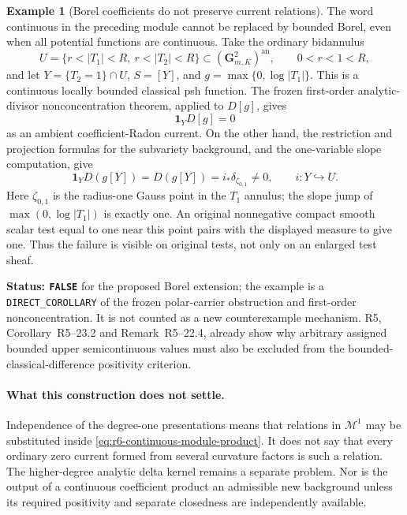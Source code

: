 \documentclass[11pt,a4paper]{article}
\numberwithin{equation}{section}
\theoremstyle{definition}
\newtheorem{example}[theorem]{Example}
\theoremstyle{remark}
\newcommand{\an}{\mathrm{an}}
\begin{document}
\begin{example}[Borel coefficients do not preserve current relations]
\label{ex:r6-borel-curvature-module-failure}
The word continuous in the preceding module cannot be replaced by
bounded Borel, even when all potential functions are continuous.
Take the ordinary bidannulus
\[
 U=\{r<|T_1|<R,\ r<|T_2|<R\}\subset(\mathbf G_{m,K}^2)^{\an},
             \qquad 0<r<1<R,
\]
and let $Y=\{T_2=1\}\cap U$, $S=[Y]$, and
$g=\max\{0,\log|T_1|\}$. This is a continuous locally bounded
classical psh function. The frozen first-order analytic-divisor
nonconcentration theorem, applied to $D[g]$, gives
\[
                         \mathbf1_YD[g]=0
\]
as an ambient coefficient-Radon current. On the other hand, the
restriction and projection formulas for the subvariety background,
and the one-variable slope computation, give
\[
 \mathbf1_YD(g[Y])=D(g[Y])=i_*\delta_{\zeta_{0,1}}\ne0,
                  \qquad i:Y\hookrightarrow U.
\]
Here $\zeta_{0,1}$ is the radius-one Gauss point in the $T_1$ annulus;
the slope jump of $\max(0,\log|T_1|)$ is exactly one. An original
nonnegative compact smooth scalar test equal to one near this point
pairs with the displayed measure to give one. Thus the failure is
visible on original tests, not only on an enlarged test sheaf.
\end{example}

\noindent\textbf{Status: \texttt{FALSE}} for the proposed Borel
extension; the example is a \texttt{DIRECT\_COROLLARY} of the frozen
polar-carrier obstruction and first-order nonconcentration. It is not
counted as a new counterexample mechanism. R5,
Corollary~\textup{R5--23.2} and
Remark~\textup{R5--22.4}, already show why
arbitrary assigned bounded upper semicontinuous values must also be
excluded from the bounded-classical-difference positivity criterion.

\paragraph{What this construction does not settle.}
Independence of the degree-one presentations means that relations in
$\mathscr M^1$ may be substituted inside
\eqref{eq:r6-continuous-module-product}. It does not say that every
ordinary zero current formed from several curvature factors is such
a relation. The higher-degree analytic delta kernel remains a separate
problem. Nor is the output of a continuous coefficient product an
admissible new background unless its required positivity and separate
closedness are independently available.
\end{document}
